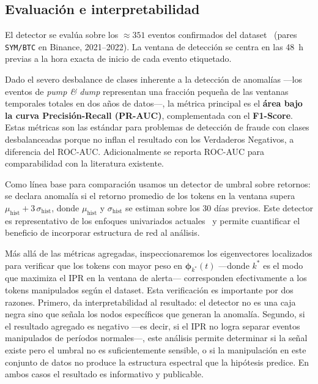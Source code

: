 \subsection{Evaluación e interpretabilidad}

El detector se evalúa sobre los ${\approx}351$ eventos confirmados del
dataset~\cite{lamorgia2020} (pares \texttt{SYM/BTC} en Binance,
2021--2022). La ventana de detección se centra en las 48~h previas a la
hora exacta de inicio de cada evento etiquetado.

Dado el severo desbalance de clases inherente a la detección de anomalías
---los eventos de \emph{pump \& dump} representan una fracción pequeña de
las ventanas temporales totales en dos años de datos---, la métrica
principal es el \textbf{área bajo la curva Precisión-Recall (PR-AUC)},
complementada con el \textbf{F1-Score}. Estas métricas son las estándar
para problemas de detección de fraude con clases desbalanceadas porque no
inflan el resultado con los Verdaderos Negativos, a diferencia del
ROC-AUC. Adicionalmente se reporta ROC-AUC para comparabilidad con la
literatura existente.

Como línea base para comparación usamos un detector de umbral sobre
retornos: se declara anomalía si el retorno promedio de los tokens en la
ventana supera $\mu_{\text{hist}} + 3\,\sigma_{\text{hist}}$, donde
$\mu_{\text{hist}}$ y $\sigma_{\text{hist}}$ se estiman sobre los 30
días previos. Este detector es representativo de los enfoques
univariados actuales~\cite{kamps2018} y permite cuantificar el
beneficio de incorporar estructura de red al análisis.

Más allá de las métricas agregadas, inspeccionaremos los eigenvectores
localizados para verificar que los tokens con mayor peso en
$\boldsymbol{\phi}_{k^*}(t)$ ---donde $k^*$ es el modo que maximiza el
IPR en la ventana de alerta--- corresponden efectivamente a los tokens
manipulados según el dataset. Esta verificación es importante por dos
razones. Primero, da interpretabilidad al resultado: el detector no es
una caja negra sino que señala los nodos específicos que generan la
anomalía. Segundo, si el resultado agregado es negativo ---es decir,
si el IPR no logra separar eventos manipulados de períodos normales---,
este análisis permite determinar si la señal existe pero el umbral no
es suficientemente sensible, o si la manipulación en este conjunto de
datos no produce la estructura espectral que la hipótesis predice. En
ambos casos el resultado es informativo y publicable.

